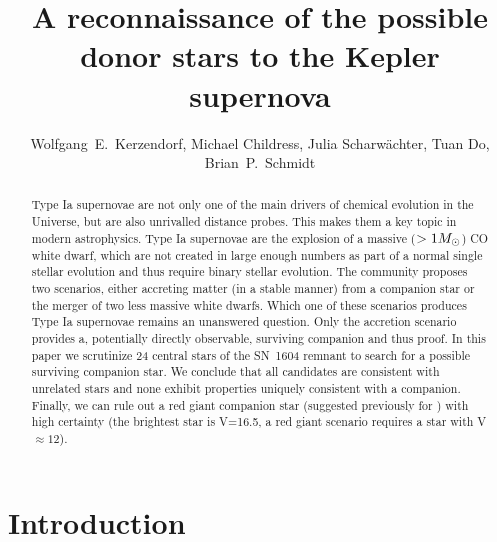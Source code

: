 \documentclass[preprint2]{aastex}
\begin{document}
\title{A reconnaissance of the possible donor stars to the Kepler supernova}

\author{Wolfgang~E.~Kerzendorf, Michael Childress, Julia Scharw\"{a}chter, Tuan Do, Brian~P.~Schmidt} 






\begin{abstract}
Type Ia supernovae are not only one of the main drivers of chemical evolution in the Universe, but are also unrivalled distance probes. This makes them a key topic in modern astrophysics. Type Ia supernovae are the explosion of a massive ($> 1 \hbox{$M_{\odot}$}$) CO white dwarf, which are not created in large enough numbers as part of a normal single stellar evolution and thus require binary stellar evolution. The community proposes two scenarios, either accreting matter (in a stable manner) from a companion star or the merger of two less massive white dwarfs. Which one of these scenarios produces Type Ia supernovae remains an unanswered question. Only the accretion scenario provides a, potentially directly observable, surviving companion and thus proof. 
In this paper we scrutinize 24 central stars  of the SN~1604 remnant to search for a possible surviving companion star. We conclude that all candidates are consistent with unrelated stars and none exhibit properties uniquely consistent with a companion. Finally, we can rule out a red giant companion star (suggested previously for ) with high certainty (the brightest star is V=16.5, a red giant scenario requires a star with V$\approx 12$).
\end{abstract}

\maketitle
\section{Introduction}
\end{document}
